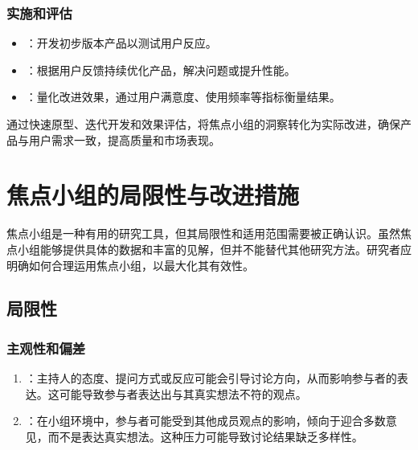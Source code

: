 \documentclass[letterpaper,10pt,english]{sphinxmanual}
\begin{document}
\subsubsection{实施和评估}
\label{\detokenize{user-research/focus-group:id31}}\begin{itemize}
\item {} 
\sphinxAtStartPar
{}：开发初步版本产品以测试用户反应。

\item {} 
\sphinxAtStartPar
{}：根据用户反馈持续优化产品，解决问题或提升性能。

\item {} 
\sphinxAtStartPar
{}：量化改进效果，通过用户满意度、使用频率等指标衡量结果。

\end{itemize}

\sphinxAtStartPar
通过快速原型、迭代开发和效果评估，将焦点小组的洞察转化为实际改进，确保产品与用户需求一致，提高质量和市场表现。


\section{焦点小组的局限性与改进措施}
\label{\detokenize{user-research/focus-group:id32}}
\sphinxAtStartPar
焦点小组是一种有用的研究工具，但其局限性和适用范围需要被正确认识。虽然焦点小组能够提供具体的数据和丰富的见解，但并不能替代其他研究方法。研究者应明确如何合理运用焦点小组，以最大化其有效性。


\subsection{局限性}
\label{\detokenize{user-research/focus-group:id33}}

\subsubsection{主观性和偏差}
\label{\detokenize{user-research/focus-group:id34}}\begin{enumerate}
%
\item {} 
\sphinxAtStartPar
{}：主持人的态度、提问方式或反应可能会引导讨论方向，从而影响参与者的表达。这可能导致参与者表达出与其真实想法不符的观点。

\item {} 
\sphinxAtStartPar
{}：在小组环境中，参与者可能受到其他成员观点的影响，倾向于迎合多数意见，而不是表达真实想法。这种压力可能导致讨论结果缺乏多样性。

\end{enumerate}
\end{document}

